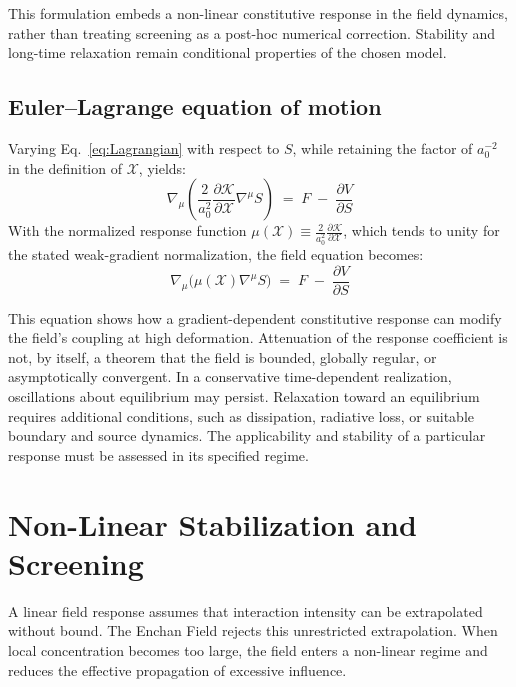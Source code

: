 \documentclass[11pt,a4paper]{article}
\begin{document}
This formulation embeds a non-linear constitutive response in the field dynamics, rather than treating screening as a post-hoc numerical correction. Stability and long-time relaxation remain conditional properties of the chosen model.

\subsection{Euler--Lagrange equation of motion}
Varying Eq.~\eqref{eq:Lagrangian} with respect to $S$, while retaining the factor of $a_0^{-2}$ in the definition of $\mathcal{X}$, yields:
\begin{equation}
\nabla_\mu \left( \frac{2}{a_0^2}\frac{\partial \mathcal{K}}{\partial \mathcal{X}} \nabla^\mu S \right) \;=\; F \;-\; \frac{\partial V}{\partial S}
\label{eq:FieldEq}
\end{equation}
With the normalized response function $\mu(\mathcal{X}) \equiv \frac{2}{a_0^2}\frac{\partial \mathcal{K}}{\partial \mathcal{X}}$, which tends to unity for the stated weak-gradient normalization, the field equation becomes:
\begin{equation}
\nabla_\mu \Big( \mu(\mathcal{X}) \nabla^\mu S \Big) \;=\; F \;-\; \frac{\partial V}{\partial S}
\label{eq:FieldEqMu}
\end{equation}

This equation shows how a gradient-dependent constitutive response can modify the field's coupling at high deformation. Attenuation of the response coefficient is not, by itself, a theorem that the field is bounded, globally regular, or asymptotically convergent. In a conservative time-dependent realization, oscillations about equilibrium may persist. Relaxation toward an equilibrium requires additional conditions, such as dissipation, radiative loss, or suitable boundary and source dynamics. The applicability and stability of a particular response must be assessed in its specified regime.

\clearpage

\section{Non-Linear Stabilization and Screening}

A linear field response assumes that interaction intensity can be extrapolated without bound. The Enchan Field rejects this unrestricted extrapolation. When local concentration becomes too large, the field enters a non-linear regime and reduces the effective propagation of excessive influence.
\end{document}

